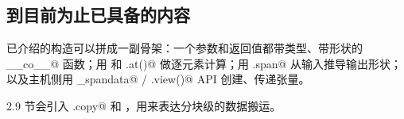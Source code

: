 \subsection*{到目前为止已具备的内容}

已介绍的构造可以拼成一副骨架：一个参数和返回值都带类型、带形状的 \co@__co__@ 函数；用 \co@parallel@ 和 \co@.at()@ 做逐元素计算；用 \co@lhs.span@ 从输入推导输出形状；以及主机侧用 \co@make_spandata@ / \co@.view()@ API 创建、传递张量。

2.9 节会引入 \co@dma.copy@ 和 \co@chunkat@，用来表达分块级的数据搬运。
